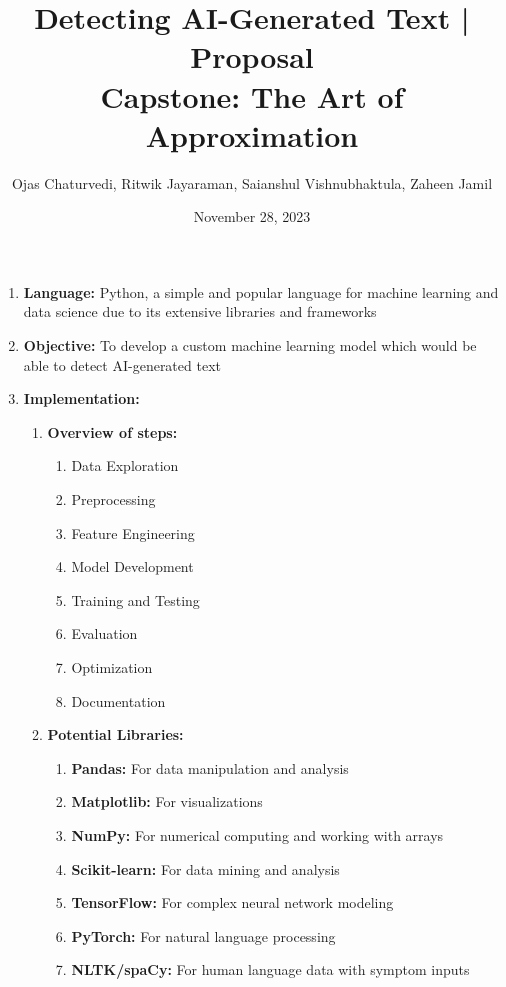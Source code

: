 \documentclass{article}
\title{Detecting AI-Generated Text | Proposal \\ \large Capstone: The Art of Approximation}
\author{Ojas Chaturvedi, Ritwik Jayaraman, Saianshul Vishnubhaktula, Zaheen Jamil}
\date{November 28, 2023}
\begin{document}
\maketitle

\begin{enumerate}
    \item \textbf{Language:} Python, a simple and popular language for machine learning and data science due to its extensive libraries and frameworks
    \item \textbf{Objective:} To develop a custom machine learning model which would be able to detect AI-generated text
    \item \textbf{Implementation:}
        \begin{enumerate}
            \item \textbf{Overview of steps:}
            \begin{enumerate}
                \item Data Exploration
                \item Preprocessing
                \item Feature Engineering
                \item Model Development
                \item Training and Testing
                \item Evaluation
                \item Optimization
                \item Documentation
            \end{enumerate}
            \item \textbf{Potential Libraries:}
            \begin{enumerate}
                \item \textbf{Pandas:} For data manipulation and analysis
                \item \textbf{Matplotlib:} For visualizations
                \item \textbf{NumPy:} For numerical computing and working with arrays
                \item \textbf{Scikit-learn:} For data mining and analysis
                \item \textbf{TensorFlow:} For complex neural network modeling
                \item \textbf{PyTorch:} For natural language processing
                \item \textbf{NLTK/spaCy:} For human language data with symptom inputs

\end{enumerate}
\end{enumerate}
\end{enumerate}
\end{document}
